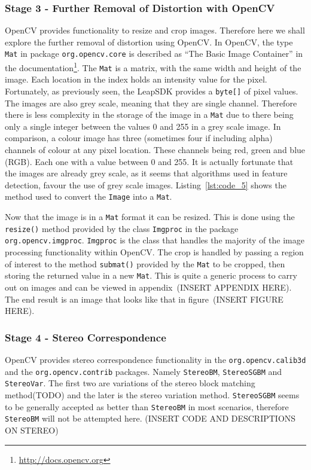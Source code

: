 \documentclass[11pt,oneside]{report}
\newcommand\code[1]{\texttt{#1}}
\begin{document}
		\subsubsection{Stage 3 - Further Removal of Distortion with OpenCV}
		OpenCV provides functionality to resize and crop images.
		Therefore here we shall explore the further removal of distortion using OpenCV.
		In OpenCV, the type \code{Mat} in package \code{org.opencv.core} is described as ``The Basic Image Container'' in the documentation\footnote{\url{http://docs.opencv.org}}.
		The \code{Mat} is a matrix, with the same width and height of the image.
		Each location in the index holds an intensity value for the pixel.
		Fortunately, as previously seen, the LeapSDK provides a \code{byte[]} of pixel values.
		The images are also grey scale, meaning that they are single channel.
		Therefore there is less complexity in the storage of the image in a \code{Mat} due to there being only a single integer between the values 0 and 255 in a grey scale image.
		In comparison, a colour image has three (sometimes four if including alpha) channels of colour at any pixel location.
		These channels being red, green and blue (RGB).
		Each one with a value between 0 and 255.
		It is actually fortunate that the images are already grey scale, as it seems that algorithms used in feature detection, favour the use of grey scale images.
		Listing~\ref{lst:code_5} shows the method used to convert the \code{Image} into a \code{Mat}.
		
		Now that the image is in a \code{Mat} format it can be resized.
		This is done using the \code{resize()} method provided by the class \code{Imgproc} in the package \code{org.opencv.imgproc}.
		\code{Imgproc} is the class that handles the majority of the image processing functionality within OpenCV.
		The crop is handled by passing a region of interest to the method \code{submat()} provided by the \code{Mat} to be cropped, then storing the returned value in a new \code{Mat}.
		This is quite a generic process to carry out on images and can be viewed in appendix~(INSERT APPENDIX HERE).
		The end result is an image that looks like that in figure~(INSERT FIGURE HERE).
		
		\subsubsection{Stage 4 - Stereo Correspondence}
		OpenCV provides stereo correspondence functionality in the \code{org.opencv.calib3d} and the \code{org.opencv.contrib} packages.
		Namely \code{StereoBM}, \code{StereoSGBM} and \code{StereoVar}.
		The first two are variations of the stereo block matching method(TODO) and the later is the stereo variation method.
		\code{StereoSGBM} seems to be generally accepted as better than \code{StereoBM} in most scenarios, therefore \code{StereoBM} will not be attempted here.
		(INSERT CODE AND DESCRIPTIONS ON STEREO)
		
\end{document}
